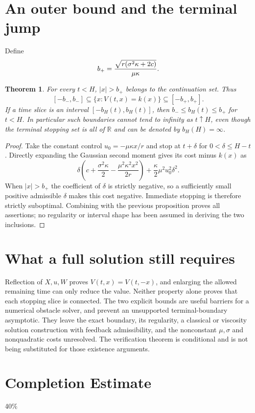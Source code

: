\documentclass[11pt]{article}
\newtheorem{theorem}{Theorem}
\theoremstyle{definition}
\begin{document}
\section*{An outer bound and the terminal jump}
Define
\[
 b_+={\sqrt{r(\sigma^2\kappa+2c)}\over\mu\kappa}.
\]
\begin{theorem}
For every $t<H$, $|x|>b_+$ belongs to the continuation set. Thus
\[
 [-b_-,b_-]\subseteq\{x:V(t,x)=k(x)\}\subseteq[-b_+,b_+].
\]
If a time slice is an interval $[-b_H(t),b_H(t)]$, then
$b_-\le b_H(t)\le b_+$ for $t<H$. In particular such boundaries cannot
tend to infinity as $t\uparrow H$, even though the terminal stopping set
is all of $\mathbb R$ and can be denoted by $b_H(H)=\infty$.
\end{theorem}
\begin{proof}
Take the constant control $u_0=-\mu\kappa x/r$ and stop at $t+\delta$
for $0<\delta\le H-t$. Directly expanding the Gaussian second moment gives
its cost minus $k(x)$ as
\[
 \delta\left(c+\frac{\sigma^2\kappa}{2}
                   -\frac{\mu^2\kappa^2x^2}{2r}\right)
 +\frac\kappa2\mu^2u_0^2\delta^2.
\]
When $|x|>b_+$ the coefficient of $\delta$ is strictly negative, so a
sufficiently small positive admissible $\delta$ makes this cost negative.
Immediate stopping is therefore strictly suboptimal. Combining with the
previous proposition proves all assertions; no regularity or interval
shape has been assumed in deriving the two inclusions.
\end{proof}

\section*{What a full solution still requires}
Reflection of $X,u,W$ proves $V(t,x)=V(t,-x)$, and enlarging the allowed
remaining time can only reduce the value. Neither property alone proves
that each stopping slice is connected. The two explicit bounds are useful
barriers for a numerical obstacle solver, and prevent an unsupported
terminal-boundary asymptotic. They leave the exact boundary, its regularity,
a classical or viscosity solution construction with feedback admissibility,
and the nonconstant $\mu,\sigma$ and nonquadratic costs unresolved. The
verification theorem is conditional and is not being substituted for those
existence arguments.

\section{Completion Estimate}
40\%
\end{document}
